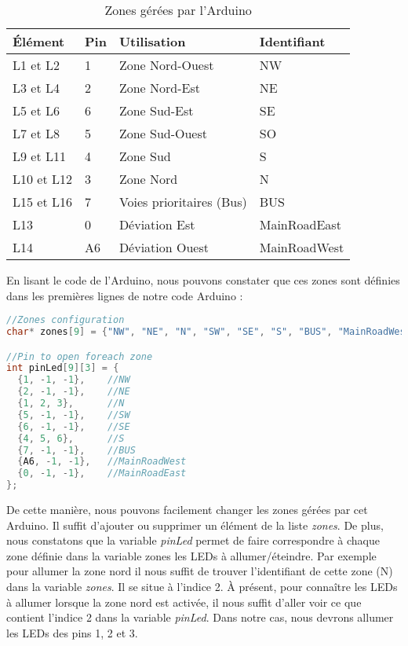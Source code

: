 \begin{table}[H]
\centering
\captionsetup{width=\textwidth}
{\renewcommand{\arraystretch}{1.5}
    \begin{tabular}{| l | l | l | l |}
    \hline
    \textbf{Élément} & \textbf{Pin} & \textbf{Utilisation} & \textbf{Identifiant}\\
    \hline
    L1 et L2 & 1 & Zone Nord-Ouest & NW\\
    \hline
    L3 et L4 & 2 & Zone Nord-Est & NE\\
    \hline
    L5 et L6 & 6 & Zone Sud-Est & SE\\
    \hline
    L7 et L8 & 5 & Zone Sud-Ouest & SO\\
    \hline
    L9 et L11 & 4 & Zone Sud & S\\
    \hline
    L10 et L12 & 3 & Zone Nord & N\\
    \hline
    L15 et L16 & 7 & Voies prioritaires (Bus) & BUS\\
    \hline
    L13 & 0 & Déviation Est & MainRoadEast\\
    \hline
    L14 & A6 & Déviation Ouest & MainRoadWest\\
    \hline
    \end{tabular}}
    \caption{Zones gérées par l'Arduino}
\end{table}

En lisant le code de l’Arduino, nous pouvons constater que ces zones sont définies dans les premières lignes de notre code Arduino :

\begin{lstlisting}[language=C, stepnumber=5, firstnumber=1, numberfirstline=true]
//Zones configuration
char* zones[9] = {"NW", "NE", "N", "SW", "SE", "S", "BUS", "MainRoadWest", "MainRoadEast"}; //Zone managed by this arduino

//Pin to open foreach zone
int pinLed[9][3] = {
  {1, -1, -1},    //NW
  {2, -1, -1},    //NE
  {1, 2, 3},      //N
  {5, -1, -1},    //SW
  {6, -1, -1},    //SE
  {4, 5, 6},      //S
  {7, -1, -1},    //BUS
  {A6, -1, -1},   //MainRoadWest
  {0, -1, -1},    //MainRoadEast
};
\end{lstlisting}

De cette manière, nous pouvons facilement changer les zones gérées par cet Arduino. Il suffit d’ajouter ou supprimer un élément de la liste \emph{zones}. De plus, nous constatons que la variable \emph{pinLed} permet de faire correspondre à chaque zone définie dans la variable zones les LEDs à allumer/éteindre. Par exemple pour allumer la zone nord il nous suffit de trouver l’identifiant de cette zone (N) dans la variable \emph{zones}. Il se situe à l’indice 2. À présent, pour connaître les LEDs à allumer lorsque la zone nord est activée, il nous suffit d’aller voir ce que contient l’indice 2 dans la variable \emph{pinLed}. Dans notre cas, nous devrons allumer les LEDs des pins 1, 2 et 3. \\

